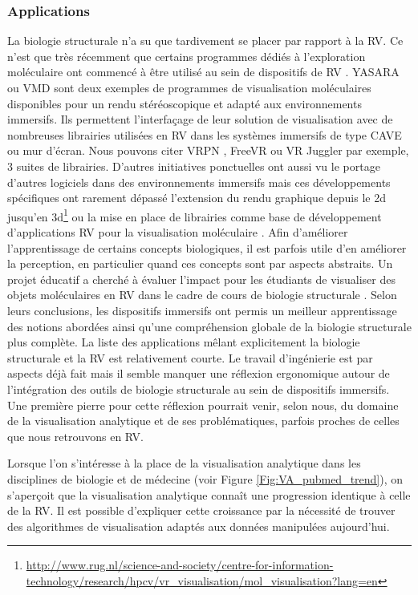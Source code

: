 \subsubsection{Applications}

La biologie structurale n'a su que tardivement se placer par rapport à la RV. Ce n'est que très récemment que certains programmes dédiés à l'exploration moléculaire ont commencé à être utilisé au sein de dispositifs de RV \cite{odonoghue_visualization_2010}. YASARA \cite{krieger2014yasara} ou VMD \cite{stone_immersive_2010} sont deux exemples de programmes de visualisation moléculaires disponibles pour un rendu stéréoscopique et adapté aux environnements immersifs. Ils permettent l'interfaçage de leur solution de visualisation avec de nombreuses librairies utilisées en RV dans les systèmes immersifs de type CAVE ou mur d'écran. Nous pouvons citer VRPN \cite{taylor2001vrpn}, FreeVR \cite{pape2004commodity} ou VR Juggler par exemple, 3 suites de librairies. 
D'autres initiatives ponctuelles ont aussi vu le portage d'autres logiciels dans des environnements immersifs mais ces développements spécifiques ont rarement dépassé l'extension du rendu graphique depuis le 2d jusqu'en 3d\footnote{\url{http://www.rug.nl/science-and-society/centre-for-information-technology/research/hpcv/vr\_visualisation/mol\_visualisation?lang=en}} ou la mise en place de librairies comme base de développement d'applications RV pour la visualisation moléculaire \cite{salvadori_moka:_2014}.  Afin d'améliorer l'apprentissage de certains concepts biologiques, il est parfois utile d'en améliorer la perception, en particulier quand ces concepts sont par aspects abstraits. Un projet éducatif a cherché à évaluer l'impact pour les étudiants de visualiser des objets moléculaires en RV dans le cadre de cours de biologie structurale \cite{tan_use_2013}. Selon leurs conclusions, les dispositifs immersifs ont permis un meilleur apprentissage des notions abordées ainsi qu'une compréhension globale de la biologie structurale plus complète.
La liste des applications mêlant explicitement la biologie structurale et la RV est relativement courte. Le travail d'ingénierie est par aspects déjà fait mais il semble manquer une réflexion ergonomique autour de l'intégration des outils de biologie structurale au sein de dispositifs immersifs. Une première pierre pour cette réflexion pourrait venir, selon nous, du domaine de la visualisation analytique et de ses problématiques, parfois proches de celles que nous retrouvons en RV.

Lorsque l'on s'intéresse à la place de la visualisation analytique dans les disciplines de biologie et de médecine (voir Figure \ref{Fig:VA_pubmed_trend}), on s'aperçoit que la visualisation analytique connaît une progression identique à celle de la RV. Il est possible d'expliquer cette croissance par la nécessité de trouver des algorithmes de visualisation adaptés aux données manipulées aujourd'hui.

